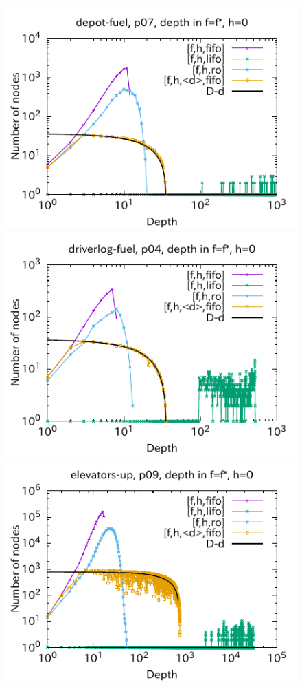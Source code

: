 \begin{figure}[htbp]
\includegraphics{img/output-lmcut/depot-fuel/p07-0.pdf}
\includegraphics{img/output-lmcut/driverlog-fuel/p04-0.pdf}
\includegraphics{img/output-lmcut/elevators-up/p09-0.pdf}

\end{figure}
